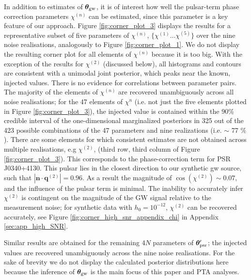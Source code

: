 \documentclass[fleqn,usenatbib,useAMS]{mnras}
\begin{document}
In addition to estimates of $\boldsymbol{\theta}_{\rm gw}$, it is of interest how well the pulsar-term phase correction parameters $\chi^{(n)}$ can be estimated, since this parameter is a key feature of our approach. Figure \ref{fig:corner_plot_3} displays the results for a representative subset of five parameters of $\chi^{(n)}$, $ \{\chi^{(1)} \dots \chi^{(5)} \}$ over the nine noise realisations, analogously to Figure \ref{fig:corner_plot_1}. We do not display the resulting corner plot for all elements of $\chi^{(n)}$ because it is too big. With the exception of the results for $\chi^{(2)}$ (discussed below), all histograms and contours are consistent with a unimodal joint posterior, which peaks near the known, injected values. There is no evidence for correlations between parameter pairs. The majority of the elements of $\chi^{(n)}$ are recovered unambiguously across all noise realisations; for the 47 elements of $\chi^{n}$ (i.e. not just the five elements plotted in Figure \ref{fig:corner_plot_3}), the injected value is  contained within the 90\% credible interval of the one-dimensional marginalized posteriors in 325 out of the 423 possible combinations of the 47 parameters and nine realizations (i.e. $\sim$ 77 $\%$). There are some elements for which consistent estimates are not obtained across multiple realisations, e.g $\chi^{(2)}$, (third row, third column of Figure \ref{fig:corner_plot_3}). This corresponds to the phase-correction term for PSR J0340+4130. This pulsar lies in the closest direction to our synthetic gw source, such that $| \boldsymbol{n} \cdot \boldsymbol{q}^{(2)}| = 0.96$. As a result the magnitude of $\cos \left( \chi^{(2)}\right) \sim 0.07$, and the influence of the pulsar term is minimal. The inability to accurately infer $\chi^{(2)}$ is contingent on the magnitude of the GW signal relative to the measurement noise; for synthetic data with $h_0 = 10^{-12}$, $\chi^{(2)}$ can be recovered accurately, see Figure \ref{fig:corner_high_snr_appendix_chi} in Appendix \ref{sec:app_high_SNR}. \newline 

Similar results are obtained for the remaining 4$N$ parameters of $\boldsymbol{\theta}_{\rm psr}'$; the injected values are recovered unambiguously across the nine noise realisations. For the sake of brevity we do not display the calculated posterior distributions here because the inference of $\boldsymbol{\theta}_{\rm gw}$ is the main focus of this paper and PTA analyses. \newline 
\end{document}
